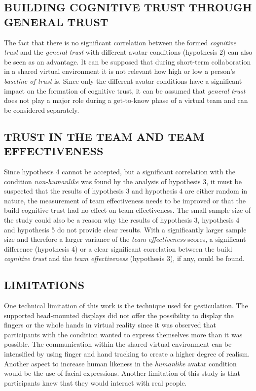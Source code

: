 \documentclass[sigchi]{acmart}
\begin{document}
\subsection{BUILDING COGNITIVE TRUST THROUGH GENERAL TRUST}
The fact that there is no significant correlation between the formed \textit{cognitive trust} and the \textit{general trust} with different avatar conditions (hypothesis 2) can also be seen as an advantage.
It can be supposed that during short-term collaboration in a shared virtual environment it is not relevant how high or low a person's \textit{baseline of trust} is. 
Since only the different avatar conditions have a significant impact on the formation of cognitive trust, it can be assumed that \textit{general trust} does not play a major role during a get-to-know phase of a virtual team and can be considered separately. %

\subsection{TRUST IN THE TEAM AND TEAM EFFECTIVENESS}
Since hypothesis 4 cannot be accepted, but a significant correlation with the condition \textit{non-humanlike} was found by the analysis of hypothesis 3, it must be suspected that the results of hypothesis 3 and hypothesis 4 are either random in nature, the measurement of team effectiveness needs to be improved or that the build cognitive trust had no effect on team effectiveness.
The small sample size of the study could also be a reason why the results of hypothesis 3, hypothesis 4 and hypothesis 5 do not provide clear results. With a significantly larger sample size and therefore a larger variance of the \textit{team effectiveness} scores, a significant difference (hypothesis 4) or a clear significant correlation between the build \textit{cognitive trust} and the \textit{team effectiveness} (hypothesis 3), if any, could be found.

\subsection{LIMITATIONS}
One technical limitation of this work is the technique used for gesticulation. The supported head-mounted displays did not offer the possibility to display the fingers or the whole hands in virtual reality since it was observed that participants with the condition  wanted to express themselves more than it was possible. The communication within the shared virtual environment can be intensified by using finger and hand tracking to create a higher degree of realism. Another aspect to increase human likeness in the \textit{humanlike} avatar condition would be the use of facial expressions.
Another limitation of this study is that participants knew that they would interact with real people. %
\end{document}
